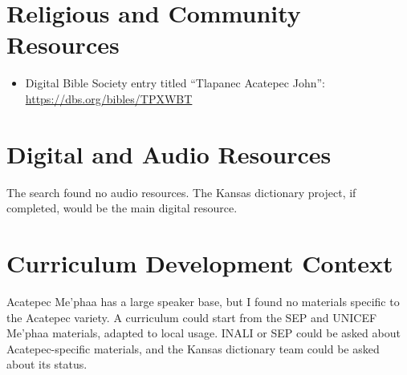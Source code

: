 \documentclass[12pt]{article}
\begin{document}
\section{Religious and Community Resources}
\begin{itemize}
\item Digital Bible Society entry titled ``Tlapanec Acatepec John'': \url{https://dbs.org/bibles/TPXWBT}
\end{itemize}

\section{Digital and Audio Resources}
The search found no audio resources. The Kansas dictionary project, if completed, would be the main digital resource.

\section{Curriculum Development Context}
Acatepec Me'phaa has a large speaker base, but I found no materials specific to the Acatepec variety. A curriculum could start from the SEP and UNICEF Me'phaa materials, adapted to local usage. INALI or SEP could be asked about Acatepec-specific materials, and the Kansas dictionary team could be asked about its status.
\end{document}
